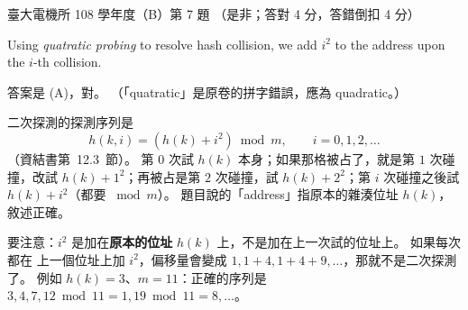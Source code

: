 \begin{pastexam}[label={px:ntu-108-ee-dsb-07}]{臺大電機所 108 學年度（B）第 7 題}
（是非；答對 4 分，答錯倒扣 4 分）

Using \textit{quatratic probing} to resolve hash collision, we add $i^2$ to the address upon the
$i$-th collision.
\end{pastexam}

\begin{pastsoln}
答案是 (A)，對。 （「quatratic」是原卷的拼字錯誤，應為 quadratic。）

二次探測的探測序列是
\[
h(k, i) = (h(k) + i^2) \bmod m, \qquad i = 0, 1, 2, \ldots
\]
（資結書第~12.3~節）。 第 $0$ 次試 $h(k)$ 本身；如果那格被占了，就是第 $1$ 次碰撞，改試
$h(k) + 1^2$；再被占是第 $2$ 次碰撞，試 $h(k) + 2^2$；第 $i$ 次碰撞之後試
$h(k) + i^2$（都要 $\bmod m$）。 題目說的「address」指原本的雜湊位址 $h(k)$，敘述正確。

要注意：$i^2$ 是加在\textbf{原本的位址} $h(k)$ 上，不是加在上一次試的位址上。 如果每次都在
上一個位址上加 $i^2$，偏移量會變成 $1, 1 + 4, 1 + 4 + 9, \ldots$，那就不是二次探測了。 例如
$h(k) = 3$、$m = 11$：正確的序列是 $3, 4, 7, 12 \bmod 11 = 1, 19 \bmod 11 = 8, \ldots$。
\end{pastsoln}
